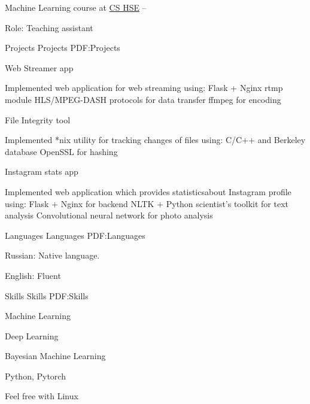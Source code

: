 \documentclass[letterpaper,MMMyyyy,nonstopmode]{simpleresumecv}
\begin{document}
\begin{Body}
\Gap

\BulletItem
Machine Learning course at \href{https://cs.hse.ru/en/}{CS HSE}
\hfill
{} --
\begin{Detail}
\Item
Role: Teaching assistant
\end{Detail}



\Section
{Projects}
{Projects}
{PDF:Projects}

\BulletItem
Web Streamer app
\begin{Detail}
\Item
Implemented web application for web streaming using:
\SubBulletItem
Flask + Nginx rtmp module
\SubBulletItem
HLS/MPEG-DASH protocols for data transfer
\SubBulletItem
ffmpeg for encoding
\end{Detail}

\Gap

\BulletItem
File Integrity tool
\begin{Detail}
\Item
Implemented *nix utility for tracking changes of files using:
\SubBulletItem
C/C++ and Berkeley database
\SubBulletItem
OpenSSL for hashing
\end{Detail}

\Gap

\BulletItem
Instagram stats app
\begin{Detail}
\Item
Implemented web application which provides statisticsabout Instagram profile using:
\SubBulletItem
Flask + Nginx for backend
\SubBulletItem
NLTK + Python scientist’s toolkit for text analysis
\SubBulletItem
Convolutional neural network for photo analysis
\end{Detail}



\Section
{Languages}
{Languages}
{PDF:Languages}

\BulletItem
Russian: Native language.

\Gap
\BulletItem
English: Fluent


\Section
{Skills}
{Skills}
{PDF:Skills}

\BulletItem
Machine Learning

\BulletItem
Deep Learning

\BulletItem
Bayesian Machine Learning

\BulletItem
Python, Pytorch

\BulletItem
Feel free with Linux


\end{Body}
\end{document}
